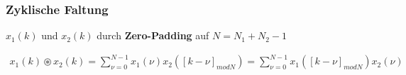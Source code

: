 \documentclass[10pt,a4paper]{article}
\begin{document}
  \subsubsection{Zyklische Faltung}
  $x_1(k)$ und $x_2(k)$ durch \textbf{Zero-Padding} auf $N = N_1 +N_2 -1$ 
\scriptsize
  \begin{mdframed}[style=exercise]
    \begin{align}
        x_1(k) \circledast x_2(k) = \sum_{\nu =0}^{N-1} x_1(\nu) x_2([k-\nu]_{modN})= \sum_{\nu =0}^{N-1}x_1([k-\nu]_{modN}) x_2(\nu)
    \end{align}
  \end{mdframed}
\normalsize
\end{document}
